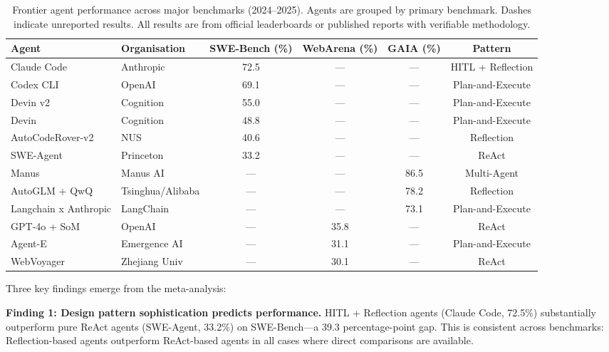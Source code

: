 \documentclass[review,authoryear]{elsarticle}
\theoremstyle{definition}
\begin{document}
\FloatBarrier
\begin{table}[!htbp]
\centering\footnotesize
\caption{Frontier agent performance across major benchmarks (2024--2025). Agents are grouped by primary benchmark. Dashes indicate unreported results. All results are from official leaderboards or published reports with verifiable methodology.}
\label{tab:benchmarks}
\begin{tabular}{@{}llcccc@{}}
\toprule
\textbf{Agent} & \textbf{Organisation} & \textbf{SWE-Bench (\%)} & \textbf{WebArena (\%)} & \textbf{GAIA (\%)} & \textbf{Pattern} \\
\midrule
Claude Code         & Anthropic      & 72.5 & ---  & ---  & HITL + Reflection \\
Codex CLI           & OpenAI         & 69.1 & ---  & ---  & Plan-and-Execute \\
Devin v2            & Cognition      & 55.0 & ---  & ---  & Plan-and-Execute \\
Devin               & Cognition      & 48.8 & ---  & ---  & Plan-and-Execute \\
AutoCodeRover-v2    & NUS            & 40.6 & ---  & ---  & Reflection \\
SWE-Agent           & Princeton      & 33.2 & ---  & ---  & ReAct \\
Manus               & Manus AI       & ---  & ---  & 86.5 & Multi-Agent \\
AutoGLM + QwQ       & Tsinghua/Alibaba & --- & ---  & 78.2 & Reflection \\
Langchain x Anthropic & LangChain    & ---  & ---  & 73.1 & Plan-and-Execute \\
GPT-4o + SoM        & OpenAI         & ---  & 35.8 & ---  & ReAct \\
Agent-E             & Emergence AI   & ---  & 31.1 & ---  & Plan-and-Execute \\
WebVoyager          & Zhejiang Univ  & ---  & 30.1 & ---  & ReAct \\
\bottomrule
\end{tabular}
\end{table}

Three key findings emerge from the meta-analysis:

\textbf{Finding 1: Design pattern sophistication predicts performance.} HITL + Reflection agents (Claude Code, 72.5\%) substantially outperform pure ReAct agents (SWE-Agent, 33.2\%) on SWE-Bench---a 39.3 percentage-point gap. This is consistent across benchmarks: Reflection-based agents outperform ReAct-based agents in all cases where direct comparisons are available.
\end{document}
